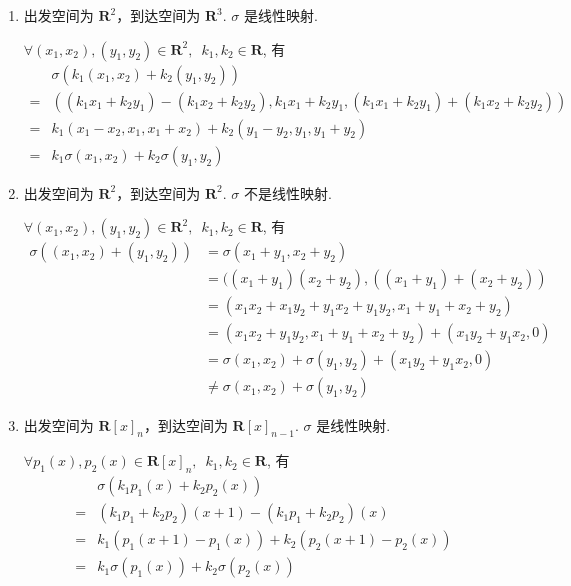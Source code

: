 \documentclass[12pt,fontset=fandol]{ctexart}
\begin{document}
\begin{solve}
\begin{enumerate}
        \item 出发空间为 $ \mathbf{R}^2 $，到达空间为 $ \mathbf{R}^3 $. $ \sigma $ 是线性映射.

              $ \forall (x_1, x_2), (y_1, y_2) \in \mathbf{R}^2,\enspace k_1, k_2 \in \mathbf{R} $, 有
              \begin{align*}
                      & \sigma(k_1(x_1, x_2) + k_2(y_1, y_2))                                                                     \\
                  ={} & ((k_1 x_1 + k_2 y_1) - (k_1 x_2 + k_2 y_2), k_1 x_1 + k_2 y_1, (k_1 x_1 + k_2 y_1) + (k_1 x_2 + k_2 y_2)) \\
                  ={} & k_1(x_1 - x_2, x_1, x_1 + x_2) + k_2(y_1 - y_2, y_1, y_1 + y_2)                                           \\
                  ={} & k_1 \sigma(x_1, x_2) + k_2 \sigma(y_1, y_2)
              \end{align*}

        \item 出发空间为 $ \mathbf{R}^2 $，到达空间为 $ \mathbf{R}^2 $. $ \sigma $ 不是线性映射.

              $ \forall (x_1, x_2), (y_1, y_2) \in \mathbf{R}^2,\enspace k_1, k_2 \in \mathbf{R} $, 有
              \begin{align*}
                  \sigma((x_1, x_2) + (y_1, y_2))
                   & = \sigma(x_1 + y_1, x_2 + y_2)                                        \\
                   & = ((x_1 + y_1)(x_2 + y_2), ((x_1 + y_1) + (x_2 + y_2))                \\
                   & = (x_1 x_2 + x_1 y_2 + y_1 x_2 + y_1 y_2, x_1 + y_1 + x_2 + y_2)      \\
                   & = (x_1 x_2 + y_1 y_2, x_1 + y_1 + x_2 + y_2) + (x_1 y_2 + y_1 x_2, 0) \\
                   & = \sigma(x_1, x_2) + \sigma(y_1, y_2) + (x_1 y_2 + y_1 x_2, 0)        \\
                   & \neq \sigma(x_1, x_2) + \sigma(y_1, y_2)
              \end{align*}

        \item 出发空间为 $ \mathbf{R}[x]_n $，到达空间为 $ \mathbf{R}[x]_{n - 1} $. $ \sigma $ 是线性映射.

              $ \forall p_1(x), p_2(x) \in \mathbf{R}[x]_n,\enspace k_1, k_2 \in \mathbf{R} $, 有
              \begin{align*}
                      & \sigma(k_1 p_1(x) + k_2 p_2(x))                     \\
                  ={} & (k_1 p_1 + k_2 p_2)(x + 1) - (k_1 p_1 + k_2 p_2)(x) \\
                  ={} & k_1(p_1(x + 1) - p_1(x)) + k_2(p_2(x + 1) - p_2(x)) \\
                  ={} & k_1 \sigma(p_1(x)) + k_2 \sigma(p_2(x))
              \end{align*}


\end{enumerate}
\end{solve}
\end{document}
